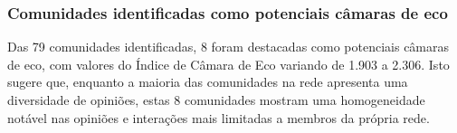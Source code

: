 \subsubsection*{Comunidades identificadas como potenciais câmaras de eco}

\begin{table}[ht]
	\centering
	\caption{Resumo das Métricas de câmaras de eco das Comunidades}
	\label{tab:community-metrics-mesquita}
\end{table}

Das 79 comunidades identificadas, 8 foram destacadas como potenciais câmaras de eco, com valores do Índice de Câmara de Eco variando de 1.903 a 2.306. Isto sugere que, enquanto a maioria das comunidades na rede apresenta uma diversidade de opiniões, estas 8 comunidades mostram uma homogeneidade notável nas opiniões e interações mais limitadas a membros da própria rede.


